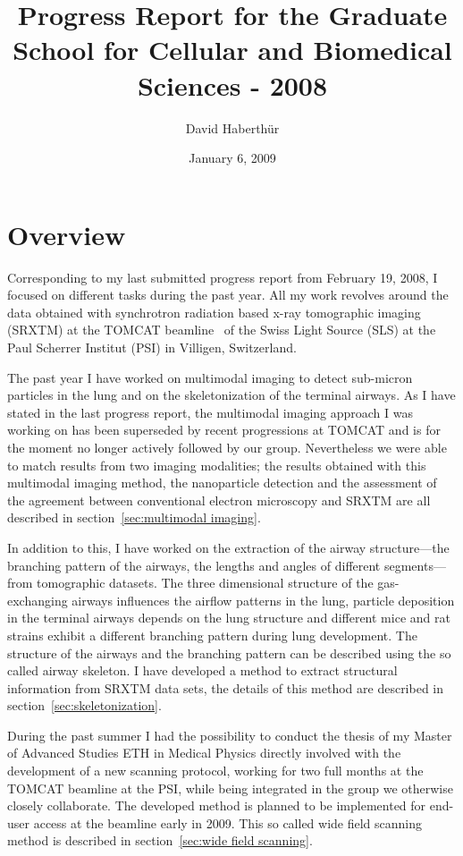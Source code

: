 \documentclass[]{scrartcl}
\title{Progress Report for the Graduate School for Cellular and Biomedical Sciences - 2008}
\author{David Haberth\"ur}
\date{January 6, 2009}
\newif\ifhtml
\begin{document}
\maketitle

\ifhtml
	\emph{Did you sort out all to dos?}
\else
\fi


\section{Overview}
Corresponding to my last submitted progress report from February 19, 2008, I focused on different tasks during the past year. All my work revolves around the data obtained with synchrotron radiation based x-ray tomographic imaging (SRXTM) at the TOMCAT beamline~\cite{Stampanoni2007} of the Swiss Light Source (SLS) at the Paul Scherrer Institut (PSI) in Villigen, Switzerland.

The past year I have worked on multimodal imaging to detect sub-micron particles in the lung and on the skeletonization of the terminal airways. As I have stated in the last progress report, the multimodal imaging approach I was working on has been superseded by recent progressions at TOMCAT and is for the moment no longer actively followed by our group. Nevertheless we were able to match results from two imaging modalities; the results obtained with this multimodal imaging method, the nanoparticle detection and the assessment of the agreement between conventional electron microscopy and SRXTM are all described in section~\ref{sec:multimodal imaging}.

In addition to this, I have worked on the extraction of the airway structure---the branching pattern of the airways, the lengths and angles of different segments---from tomographic datasets. The three dimensional structure of the gas-exchanging airways influences the airflow patterns in the lung, particle deposition in the terminal airways depends on the lung structure and different mice and rat strains exhibit a different branching pattern during lung development. The structure of the airways and the branching pattern can be described using the so called airway skeleton. I have developed a method to extract structural information from SRXTM data sets, the details of this method are described in section~\ref{sec:skeletonization}.

During the past summer I had the possibility to conduct the thesis of my Master of Advanced Studies ETH in Medical Physics directly involved with the development of a new scanning protocol, working for two full months at the TOMCAT beamline at the PSI, while being integrated in the group we otherwise closely collaborate. The developed method is planned to be implemented for end-user access at the beamline early in 2009. This so called wide field scanning method is described in section~\ref{sec:wide field scanning}.
\end{document}
